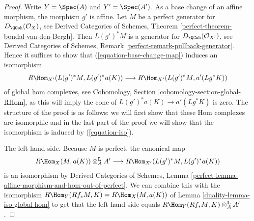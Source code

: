 \begin{proof}

Write $Y = \Spec(A)$ and $Y' = \Spec(A')$. As a base change of an affine
morphism, the morphism $g'$ is affine. Let $M$ be a perfect generator
for $D_\QCoh(\mathcal{O}_X)$, see Derived Categories of Schemes, Theorem
\ref{perfect-theorem-bondal-van-den-Bergh}. Then $L(g')^*M$ is a
generator for $D_\QCoh(\mathcal{O}_{X'})$, see
Derived Categories of Schemes, Remark \ref{perfect-remark-pullback-generator}.
Hence it suffices to show that (\ref{equation-base-change-map})
induces an isomorphism
\begin{equation}
\label{equation-iso}
R\Hom_{X'}(L(g')^*M, L(g')^*a(K))
\longrightarrow
R\Hom_{X'}(L(g')^*M, a'(Lg^*K))
\end{equation}
of global hom complexes, see
Cohomology, Section \ref{cohomology-section-global-RHom},
as this will imply the cone of $L(g')^*a(K) \to a'(Lg^*K)$
is zero.
The structure of the proof is as follows: we will first show that
these Hom complexes are isomorphic and in the last part of the proof
we will show that the isomorphism is induced by (\ref{equation-iso}).

\medskip\noindent
The left hand side. Because $M$ is perfect, the canonical map
$$
R\Hom_X(M, a(K)) \otimes^\mathbf{L}_A A'
\longrightarrow
R\Hom_{X'}(L(g')^*M, L(g')^*a(K))
$$
is an isomorphism by Derived Categories of Schemes, Lemma
\ref{perfect-lemma-affine-morphism-and-hom-out-of-perfect}.
We can combine this with the isomorphism
$R\Hom_Y(Rf_*M, K) = R\Hom_X(M, a(K))$
of Lemma \ref{duality-lemma-iso-global-hom}
to get that the left hand side equals
$R\Hom_Y(Rf_*M, K) \otimes^\mathbf{L}_A A'$.


\end{proof}

